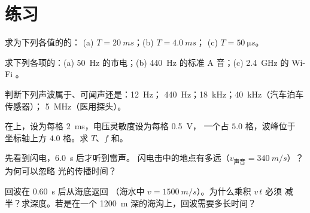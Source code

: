 \section{练习}

\begin{exercise}[$\star$]\label{exo:g10:signals-and-waves:1}
求为下列各值的的：
(a) $T = \qty{20}{ms}$；(b) $T = \qty{4.0}{ms}$；
(c) $T = \qty{50}{\micro s}$。
\end{exercise}

\begin{exercise}[$\star$]\label{exo:g10:signals-and-waves:2}
求下列各项的：(a) \qty{50}{Hz} 的市电；(b) \qty{440}{Hz}
的标准 A 音；(c) \qty{2.4}{GHz} 的 Wi-Fi 。
\end{exercise}

\begin{exercise}[$\star$]\label{exo:g10:signals-and-waves:3}
判断下列声波属于、可闻声还是：\qty{12}{Hz}；
\qty{440}{Hz}；\qty{18}{kHz}；\qty{40}{kHz}（汽车泊车传感器）；
\qty{5}{MHz}（医用探头）。
\end{exercise}

\begin{exercise}[$\star$]\label{exo:g10:signals-and-waves:4}
在上，设为每格 \qty{2}{ms}，电压灵敏度设为每格 \qty{0.5}{V}，
一个占 $5.0$ 格，波峰位于
坐标轴上方 $4.0$ 格。求 $T$、$f$ 和。
\end{exercise}

\begin{exercise}[$\star$]\label{exo:g10:signals-and-waves:5}
先看到闪电，\qty{6.0}{s} 后才听到雷声。
闪电击中的地点有多远（$v_{\text{声音}} = \qty{340}{m/s}$）？为何可以忽略
光的传播时间？
\end{exercise}

\begin{exercise}[$\star\star$]\label{exo:g10:signals-and-waves:6}
回波在 \qty{0.60}{s} 后从海底返回
（海水中 $v = \qty{1500}{m/s}$）。为什么乘积 $v\,t$ 必须
减半？求深度。若是在一个
\qty{1200}{m} 深的海沟上，回波需要多长时间？
\end{exercise}

